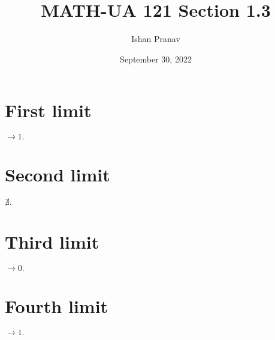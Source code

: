 \documentclass[12pt]{article}
\title{MATH-UA 121 Section 1.3}
\author{Ishan Pranav}
\date{September 30, 2022}
\begin{document}
\maketitle
\section{First limit}
$\to 1.$
\section{Second limit}
$\nexists.$
\section{Third limit}
$\to 0.$
\section{Fourth limit}
$\to 1.$
\end{document}
